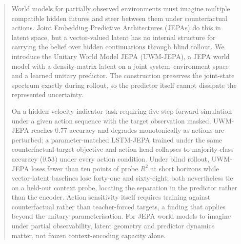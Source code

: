 \begin{abstract}
World models for partially observed environments must imagine
multiple compatible hidden futures and steer between them under
counterfactual actions. Joint Embedding Predictive Architectures
(JEPAs) do this in latent space, but a vector-valued latent has no
internal structure for carrying the belief over hidden continuations
through blind rollout. We introduce the Unitary World Model JEPA
(UWM-JEPA), a JEPA world model with a density-matrix latent on a
joint system--environment space and a learned unitary predictor. The
construction preserves the joint-state spectrum exactly during
rollout, so the predictor itself cannot dissipate the represented
uncertainty.

On a hidden-velocity indicator task requiring five-step forward
simulation under a given action sequence with the target observation
masked, UWM-JEPA reaches $0.77$ accuracy and degrades monotonically
as actions are perturbed; a parameter-matched LSTM-JEPA trained
under the same counterfactual-target objective and action head
collapses to majority-class accuracy ($0.53$) under every action
condition. Under blind rollout, UWM-JEPA loses fewer than ten points
of probe $R^2$ at short horizons while vector-latent baselines lose
forty-one and sixty-eight; both nevertheless tie on a held-out
context probe, locating the separation in the predictor rather than
the encoder. Action sensitivity itself requires training against
counterfactual rather than teacher-forced targets, a finding that
applies beyond the unitary parameterisation. For JEPA world models
to imagine under partial observability, latent geometry and
predictor dynamics matter, not frozen context-encoding capacity
alone.
\end{abstract}
